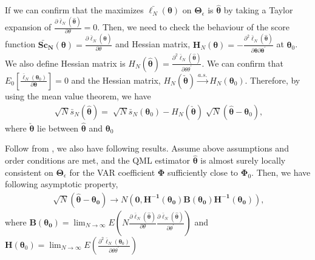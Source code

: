 \documentclass[12pt,a4paper,hyperref]{article}
\begin{document}
If we can confirm that the maximizes $\bar{\ell_{N}}(\boldsymbol{\theta})$ on $\boldsymbol{\Theta}_{\epsilon}$ is $\boldsymbol{\hat{\theta}}$ by taking a Taylor expansion of $\frac{\partial\bar{\ell}_{N}\left(\boldsymbol{ \hat{\theta}} \right)}{\partial \theta}=0$. Then, we need to check the behaviour of the score function $\boldsymbol{\bar{Sc}_{N}(\theta)}=\frac{\partial\bar{\ell}_{N}\left(\boldsymbol{ \hat{\theta}} \right)}{\partial \theta}$ and Hessian matrix, $\boldsymbol{H}_{N}(\boldsymbol{\theta})=-\frac{\partial^{2}\bar{\ell}_{N}\left(\boldsymbol{ \hat{\theta}} \right)}{\partial \boldsymbol{\theta}\partial \boldsymbol{\theta}^{'}}$ at $\boldsymbol{\theta}_{0}$. We also define Hessian matrix is  $H_{N}\left( \boldsymbol{\hat{\theta}}\right)=\frac{\partial^{2}\bar{\ell}_{N}\left(\boldsymbol{ \hat{\theta}} \right)}{\partial \theta \theta^{'}}$.
We can confirm that $E_{0}\left[ \frac{\bar{\ell}_{N}(\boldsymbol{\theta}_{0})}{\partial \boldsymbol{\theta}}  \right]=0$ and the Hessian matrix, $H_{N}\left( \boldsymbol{\check{\theta}}\right) \overset{a.s.}{\to} H_{N}\left( \boldsymbol{\theta}_{0}\right)$.
 Therefore, by using the mean value theorem, we have
\begin{align}
\sqrt[]{N}\bar{s}_{N}\left( \hat{\boldsymbol{\theta}} \right)=\sqrt[]{N}\bar{s}_{N}\left( \boldsymbol{\theta}_{0}\right)-H_{N} ( \boldsymbol{\check{\theta}} )\sqrt[]{N} ( \boldsymbol{\hat{\theta}}-\boldsymbol{\theta}_{0} ),
\end{align}
where $\boldsymbol{\check{\theta}}$ lie between $\boldsymbol{\hat{\theta}}$ and $\boldsymbol{\theta}_{0}$

Follow from \citep{Hayakawa:2018}, we also have following results.
Assume above assumptions and order conditions are met, and the QML estimator $\boldsymbol{\hat{\theta}}$ is almost surely locally consistent on $\boldsymbol{\Theta}_{\epsilon}$ for the VAR coefficient $\boldsymbol{\Phi}$ sufficiently close to $\boldsymbol{\Phi}_{0}$. Then, we have following asymptotic property,
\begin{align}
\sqrt[]{N}\left( \boldsymbol{\hat{\theta}-\theta_{0}} \right)\rightarrow N\left(\boldsymbol{0, H^{-1}(\theta_{0})}\boldsymbol{B(\theta_{0})} \boldsymbol{H^{-1}(\theta_{0})} \right),
\end{align}
where $\boldsymbol{B(\theta_{0})}=\lim_{N \rightarrow \infty} E (N\frac{\partial\bar{\ell}_{N}\left(\boldsymbol{ \hat{\theta}} \right)}{\partial \theta}\frac{\partial\bar{\ell}_{N}\left(\boldsymbol{ \hat{\theta}} \right)}{\partial \theta^{'}})$ and $\boldsymbol{H}(\boldsymbol{\theta}_{0})=\lim_{N \rightarrow \infty}E(\frac{\partial^{2}\bar{\ell}_{N}\left(\boldsymbol{ \theta}_{0} \right)}{\partial \theta \theta^{'}})$
\end{document}
